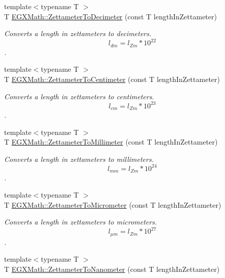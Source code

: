 \begin{DoxyCompactItemize}
{\footnotesize template$<$typename T $>$ }\\T \mbox{\hyperlink{group___e_g_x_math-_conversions-_length_conversions-_s_i-_zettameter-_s_i_gadee88d17dc42d5a94ff2bbb0dfe05a71}{E\+G\+X\+Math\+::\+Zettameter\+To\+Decimeter}} (const T length\+In\+Zettameter)
\begin{DoxyCompactList}\small\item\em Converts a length in zettameters to decimeters. \[ l_{dm}=l_{Zm} * 10^{22} \]. \end{DoxyCompactList}\item 
{\footnotesize template$<$typename T $>$ }\\T \mbox{\hyperlink{group___e_g_x_math-_conversions-_length_conversions-_s_i-_zettameter-_s_i_gae555780970b9583ec04265ea8e422e7c}{E\+G\+X\+Math\+::\+Zettameter\+To\+Centimeter}} (const T length\+In\+Zettameter)
\begin{DoxyCompactList}\small\item\em Converts a length in zettameters to centimeters. \[ l_{cm}=l_{Zm} * 10^{23} \]. \end{DoxyCompactList}\item 
{\footnotesize template$<$typename T $>$ }\\T \mbox{\hyperlink{group___e_g_x_math-_conversions-_length_conversions-_s_i-_zettameter-_s_i_ga0a4789d57f14de64a2a3579745c7c5b5}{E\+G\+X\+Math\+::\+Zettameter\+To\+Millimeter}} (const T length\+In\+Zettameter)
\begin{DoxyCompactList}\small\item\em Converts a length in zettameters to millimeters. \[ l_{mm}=l_{Zm} * 10^{24} \]. \end{DoxyCompactList}\item 
{\footnotesize template$<$typename T $>$ }\\T \mbox{\hyperlink{group___e_g_x_math-_conversions-_length_conversions-_s_i-_zettameter-_s_i_ga495f68a50945d994b3f2d455b3348595}{E\+G\+X\+Math\+::\+Zettameter\+To\+Micrometer}} (const T length\+In\+Zettameter)
\begin{DoxyCompactList}\small\item\em Converts a length in zettameters to micrometers. \[ l_{\mu m}=l_{Zm} * 10^{27} \]. \end{DoxyCompactList}\item 
{\footnotesize template$<$typename T $>$ }\\T \mbox{\hyperlink{group___e_g_x_math-_conversions-_length_conversions-_s_i-_zettameter-_s_i_ga07934308bcd823e960e1c4be504e5afd}{E\+G\+X\+Math\+::\+Zettameter\+To\+Nanometer}} (const T length\+In\+Zettameter)

\end{DoxyCompactItemize}
